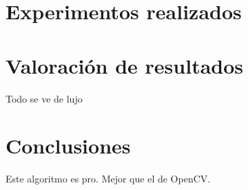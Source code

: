 \documentclass[a4paper, 11pt]{article}
\theoremstyle{definition}
\begin{document}
    \section{Experimentos realizados}



    \section{Valoración de resultados}

    Todo se ve de lujo

    \section{Conclusiones}

    Este algoritmo es pro. Mejor que el de OpenCV.



    
    
\end{document}

